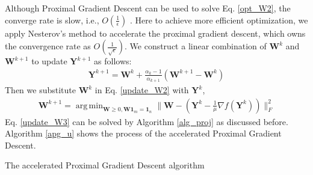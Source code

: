 \documentclass[10pt,journal,compsoc]{IEEEtran}
\DeclareMathOperator*{\argmin}{arg\,min}
\begin{document}
Although Proximal Gradient Descent can be used to solve Eq. \eqref{opt_W2}, the converge rate is slow, i.e., $O(\frac{1}{\epsilon})$ \cite{}. Here to achieve more efficient optimization, we apply Nesterov's method \cite{} to accelerate the proximal gradient descent, which owns the convergence rate as $O(\frac{1}{\sqrt{\epsilon}})$. We construct a linear combination of $\mathbf{W}^k$ and $\mathbf{W}^{k+1}$ to update $\mathbf{Y}^{k+1}$ as follows:
\begin{align}
\mathbf{Y}^{k+1}=\mathbf{W}^k+\frac{\alpha_k-1}{\alpha_{k+1}}(\mathbf{W}^{k+1}-\mathbf{W}^k)
\end{align}
Then we substitute $\mathbf{W}^k$ in Eq. \eqref{update_W2} with $\mathbf{Y}^k$,
\begin{align}\label{update_W3}
\mathbf{W}^{k+1}=\argmin_{\mathbf{W}\geq0,\mathbf{W} \mathbf{1}_{m} = \mathbf{1}_{n}}\|\mathbf{W}-\left(\mathbf{Y}^k-\frac{1}{\mu}\nabla f(\mathbf{Y}^k)\right)\|_F^2
\end{align}
Eq. \eqref{update_W3} can be solved by Algorithm \ref{alg_proj} as discussed before. Algorithm \ref{apg_u} shows the process of the accelerated Proximal Gradient Descent.
\begin{algorithm}
    \caption{The accelerated Proximal Gradient Descent algorithm}
  \label{apg_u}
  \begin{algorithmic}
  \REPEAT
  \end{algorithmic}
\end{algorithm}
\end{document}
